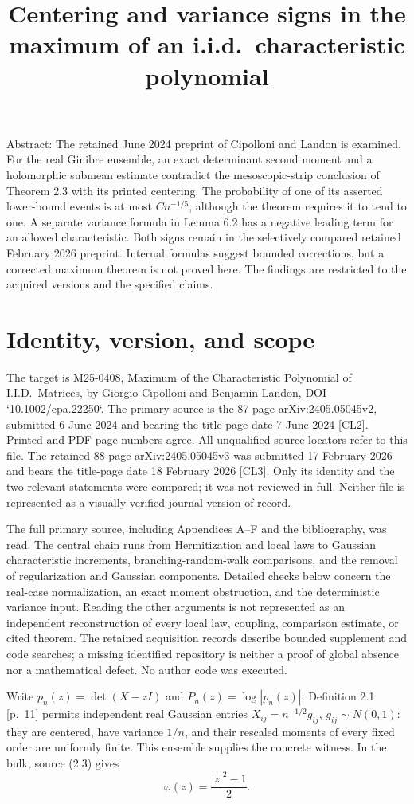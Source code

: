 \documentclass[10pt]{article}
\title{Centering and variance signs in the maximum
of an i.i.d. characteristic polynomial}
\author{}
\date{}
\begin{document}
\maketitle
Abstract: The retained June 2024 preprint of Cipolloni and Landon is examined. For the real Ginibre ensemble, an exact determinant second moment and a holomorphic submean estimate contradict the mesoscopic-strip conclusion of Theorem 2.3 with its printed centering. The probability of one of its asserted lower-bound events is at most \(C n^{-1/5}\), although the theorem requires it to tend to one. A separate variance formula in Lemma 6.2 has a negative leading term for an allowed characteristic. Both signs remain in the selectively compared retained February 2026 preprint. Internal formulas suggest bounded corrections, but a corrected maximum theorem is not proved here. The findings are restricted to the acquired versions and the specified claims.\par
\section*{Identity, version, and scope}
The target is M25-0408, Maximum of the Characteristic Polynomial of I.I.D. Matrices, by Giorgio Cipolloni and Benjamin Landon, DOI `10.1002/cpa.22250`. The primary source is the 87-page arXiv:2405.05045v2, submitted 6 June 2024 and bearing the title-page date 7 June 2024 [CL2]. Printed and PDF page numbers agree. All unqualified source locators refer to this file. The retained 88-page arXiv:2405.05045v3 was submitted 17 February 2026 and bears the title-page date 18 February 2026 [CL3]. Only its identity and the two relevant statements were compared; it was not reviewed in full. Neither file is represented as a visually verified journal version of record.\par
The full primary source, including Appendices A–F and the bibliography, was read. The central chain runs from Hermitization and local laws to Gaussian characteristic increments, branching-random-walk comparisons, and the removal of regularization and Gaussian components. Detailed checks below concern the real-case normalization, an exact moment obstruction, and the deterministic variance input. Reading the other arguments is not represented as an independent reconstruction of every local law, coupling, comparison estimate, or cited theorem. The retained acquisition records describe bounded supplement and code searches; a missing identified repository is neither a proof of global absence nor a mathematical defect. No author code was executed.\par
Write \(p_n(z)=\det(X-zI)\) and \(P_n(z)=\log|p_n(z)|\). Definition 2.1 [p. 11] permits independent real Gaussian entries \(X_{ij}=n^{-1/2}g_{ij}\), \(g_{ij}\sim N(0,1)\): they are centered, have variance \(1/n\), and their rescaled moments of every fixed order are uniformly finite. This ensemble supplies the concrete witness. In the bulk, source (2.3) gives \[\varphi(z)=\frac{|z|^2-1}{2}.\]\par
\end{document}
